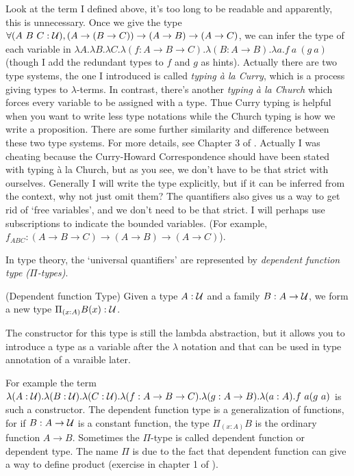 Look at the term I defined above, it's too long to be readable and apparently, 
this is unnecessary. Once we give the type $\forall (A\ B\ C:\mathcal{U}), 
(A\to(B\to C))\to(A\to B)\to (A\to C)$, we can infer the type of each 
variable in $\lambda A.\lambda B. \lambda C. \lambda (f: A\to B\to C). 
\lambda (B: A\to B).\lambda a. f\ a\ (g\ a)$ (though I add the redundant
types to $f$ and $g$ as hints). Actually there are two type systems, the
one I introduced is called {\it typing \`a la Curry}, which is a process
giving types to $\lambda$-terms. In contrast, there's another {\it typing
\`a la Church} which forces every variable to be assigned with a type.
Thue Curry typing is helpful when you want to write less type notations 
while the Church typing is how we write a proposition. There are some
further similarity and difference between these two type systems. For
more details, see Chapter 3 of \cite{Curry-Howard}. Actually I was
cheating because the Curry-Howard Correspondence should have been stated
with typing \`a la Church, but as you see, we don't have to be that strict
with ourselves. Generally I will write the type explicitly, but if it can
be inferred from the context, why not just omit them? The quantifiers also
gives us a way to get rid of `free variables', and we don't need to be that
strict. I will perhaps use subscriptions to indicate the bounded variables.
(For example, $f_{ABC}: (A\to B\to C)\to(A\to B)\to(A\to C)$).

In type theory, the `universal quantifiers' are represented by {\it
dependent function type ($\Pi$-types)}.

\begin{definition}
    \label{dependent-function}
    (Dependent function Type) Given a type $A:\mathcal{U}$ and a family 
    $B:A\to\mathcal{U}$, we form a new type $\Pi_{(x:A)}B(x): \mathcal{U}$.

    The constructor for this type is still the lambda abstraction,
    but it allows you to introduce a type as a variable after the $\lambda$
    notation and that can be used in type annotation of a varaible later.

\end{definition}

For example the term $\lambda (A:\mathcal{U}).\lambda (B:\mathcal{U}).\lambda (C:\mathcal{U}).\lambda (f: A\to B\to C).
\lambda (g: A\to B).\lambda (a: A). f\ a (g\ a)$ is such a constructor.
The dependent function type is a generalization of functions, for if
$B:A\to\mathcal{U}$ is a constant function, the type $\Pi_{(x:A)}B$ is
the ordinary function $A\to B$. Sometimes the $\Pi$-type is called 
dependent function or dependent type. The name $\Pi$ is due to the fact
that dependent function can give a way to define product (exercise in
chapter 1 of \cite{homotopy-type-theory}).

